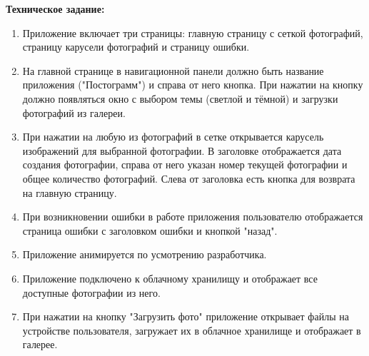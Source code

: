 \textbf{Техническое задание:}

\begin{enumerate}
    \item Приложение включает три страницы: главную страницу с сеткой фотографий, страницу карусели фотографий и страницу ошибки.
    \item На главной странице в навигационной панели должно быть название приложения ("Постограмм") и справа от него кнопка. При нажатии на кнопку должно появляться окно с выбором темы (светлой и тёмной) и загрузки фотографий из галереи.
    \item При нажатии на любую из фотографий в сетке открывается карусель изображений для выбранной фотографии. В заголовке отображается дата создания фотографии, справа от него указан номер текущей фотографии и общее количество фотографий. Слева от заголовка есть кнопка для возврата на главную страницу.
    \item При возникновении ошибки в работе приложения пользователю отображается страница ошибки с заголовком ошибки и кнопкой "назад".
    \item Приложение анимируется по усмотрению разработчика.
    \item Приложение подключено к облачному хранилищу и отображает все доступные фотографии из него.
    \item При нажатии на кнопку "Загрузить фото" приложение открывает файлы на устройстве пользователя, загружает их в облачное хранилище и отображает в галерее.
\end{enumerate}


